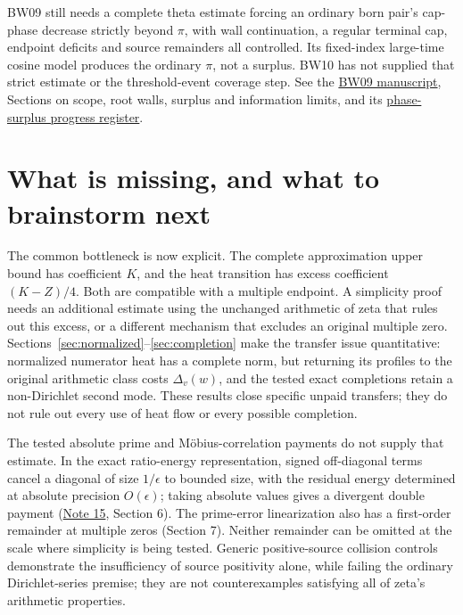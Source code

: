 \documentclass[11pt]{article}
\newcommand{\Href}{\href{../notes/15_COMPLETED_RATIO_ENERGY_AND_MULTIPLICITY_20261020.md}{Note 15}}
\begin{document}
BW09 still needs a complete theta estimate forcing an ordinary born
pair's cap-phase decrease strictly beyond \(\pi\), with wall
continuation, a regular terminal cap, endpoint deficits and source
remainders all controlled. Its fixed-index large-time cosine model
produces the ordinary \(\pi\), not a surplus. BW10 has not supplied
that strict estimate or the threshold-event coverage step. See the
\href{../../09_expanding_contour_later_collision/manuscript/main.tex}{BW09 manuscript},
Sections on scope, root walls, surplus and information limits, and its
\href{../../09_expanding_contour_later_collision/research-progress/03_ANALYTICAL_PHASE_SURPLUS_PROGRESS_20261020.md}{phase-surplus progress register}.

\section{What is missing, and what to brainstorm next}
The common bottleneck is now explicit. The complete approximation
upper bound has coefficient \(K\), and the heat transition has
excess coefficient \((K-Z)/4\). Both are compatible with a multiple
endpoint. A simplicity proof needs an additional estimate using the
unchanged arithmetic of zeta that rules out this excess, or a different
mechanism that excludes an original multiple zero.
Sections~\ref{sec:normalized}--\ref{sec:completion} make the transfer
issue quantitative: normalized numerator heat has a complete norm,
but returning its profiles to the original arithmetic class costs
\(\Delta_v(w)\), and the tested exact completions retain a
non-Dirichlet second mode. These results close specific unpaid
transfers; they do not rule out every use of heat flow or every
possible completion.

The tested absolute prime and M\"obius-correlation payments do not
supply that estimate. In the exact ratio-energy representation, signed
off-diagonal terms cancel a diagonal of size \(1/\epsilon\) to bounded
size, with the residual energy determined at absolute precision
\(O(\epsilon)\); taking absolute values gives a divergent
double payment (\Href, Section 6). The prime-error linearization
also has a first-order remainder at multiple zeros (Section 7).
Neither remainder can be omitted at the scale where simplicity is
being tested. Generic positive-source collision controls demonstrate
the insufficiency of source positivity alone, while failing the
ordinary Dirichlet-series premise; they are not counterexamples
satisfying all of zeta's arithmetic properties.
\end{document}
